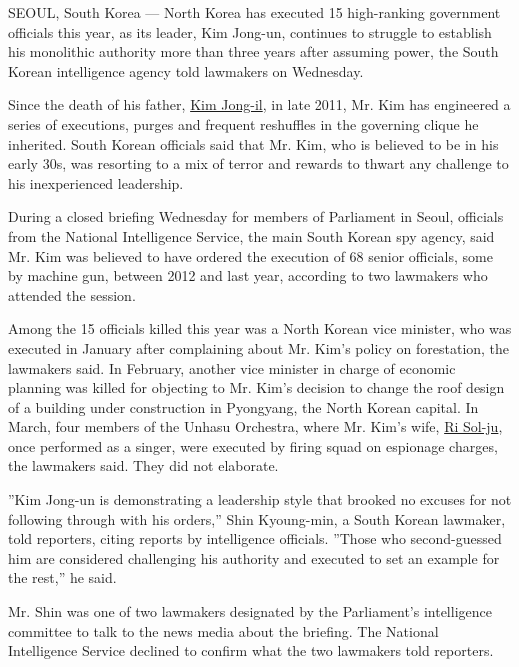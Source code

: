 SEOUL, South Korea --- North Korea has executed 15 high-ranking
government officials this year, as its leader, Kim Jong-un, continues to
struggle to establish his monolithic authority more than three years
after assuming power, the South Korean intelligence agency told
lawmakers on Wednesday.

Since the death of his father,
\href{http://www.nytimes3xbfgragh.onion/2011/12/19/world/asia/Kim-Jong-il-Dictator-Who-Turned-North-Korea-Into-a-Nuclear-State-Dies.html}{Kim
Jong-il}, in late 2011, Mr. Kim has engineered a series of executions,
purges and frequent reshuffles in the governing clique he inherited.
South Korean officials said that Mr. Kim, who is believed to be in his
early 30s, was resorting to a mix of terror and rewards to thwart any
challenge to his inexperienced leadership.

During a closed briefing Wednesday for members of Parliament in Seoul,
officials from the National Intelligence Service, the main South Korean
spy agency, said Mr. Kim was believed to have ordered the execution of
68 senior officials, some by machine gun, between 2012 and last year,
according to two lawmakers who attended the session.

Among the 15 officials killed this year was a North Korean vice
minister, who was executed in January after complaining about Mr. Kim's
policy on forestation, the lawmakers said. In February, another vice
minister in charge of economic planning was killed for objecting to Mr.
Kim's decision to change the roof design of a building under
construction in Pyongyang, the North Korean capital. In March, four
members of the Unhasu Orchestra, where Mr. Kim's wife,
\href{http://www.nytimes3xbfgragh.onion/2012/07/26/world/asia/north-korean-leader-marries-reports-say.html}{Ri
Sol-ju}, once performed as a singer, were executed by firing squad on
espionage charges, the lawmakers said. They did not elaborate.

''Kim Jong-un is demonstrating a leadership style that brooked no
excuses for not following through with his orders,'' Shin Kyoung-min, a
South Korean lawmaker, told reporters, citing reports by intelligence
officials. ''Those who second-guessed him are considered challenging his
authority and executed to set an example for the rest,'' he said.

Mr. Shin was one of two lawmakers designated by the Parliament's
intelligence committee to talk to the news media about the briefing. The
National Intelligence Service declined to confirm what the two lawmakers
told reporters.

